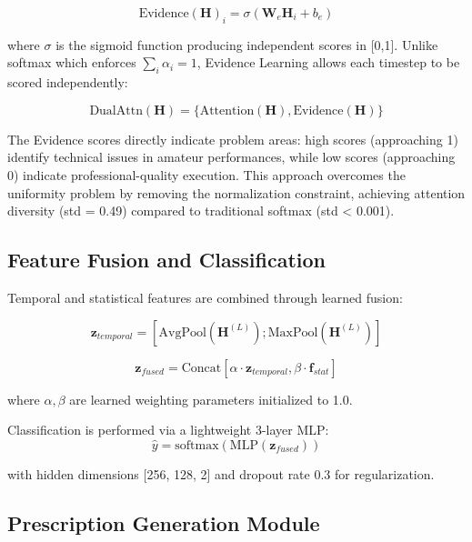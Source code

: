 \documentclass[sigconf,review,anonymous]{acmart}
\begin{document}
\begin{equation}
\text{Evidence}(\mathbf{H})_i = \sigma(\mathbf{W}_e \mathbf{H}_i + b_e)
\end{equation}

where $\sigma$ is the sigmoid function producing independent scores in [0,1]. Unlike softmax which enforces $\sum_i \alpha_i = 1$, Evidence Learning allows each timestep to be scored independently:

\begin{equation}
\text{DualAttn}(\mathbf{H}) = \{\text{Attention}(\mathbf{H}), \text{Evidence}(\mathbf{H})\}
\end{equation}

The Evidence scores directly indicate problem areas: high scores (approaching 1) identify technical issues in amateur performances, while low scores (approaching 0) indicate professional-quality execution. This approach overcomes the uniformity problem by removing the normalization constraint, achieving attention diversity (std = 0.49) compared to traditional softmax (std < 0.001).

\subsection{Feature Fusion and Classification}

Temporal and statistical features are combined through learned fusion:

\begin{equation}
\mathbf{z}_{temporal} = [\text{AvgPool}(\mathbf{H}^{(L)}); \text{MaxPool}(\mathbf{H}^{(L)})]
\end{equation}

\begin{equation}
\mathbf{z}_{fused} = \text{Concat}[\alpha \cdot \mathbf{z}_{temporal}, \beta \cdot \mathbf{f}_{stat}]
\end{equation}

where $\alpha, \beta$ are learned weighting parameters initialized to 1.0.

Classification is performed via a lightweight 3-layer MLP:
\begin{equation}
\hat{y} = \text{softmax}(\text{MLP}(\mathbf{z}_{fused}))
\end{equation}

with hidden dimensions [256, 128, 2] and dropout rate 0.3 for regularization.

\subsection{Prescription Generation Module}
\end{document}
